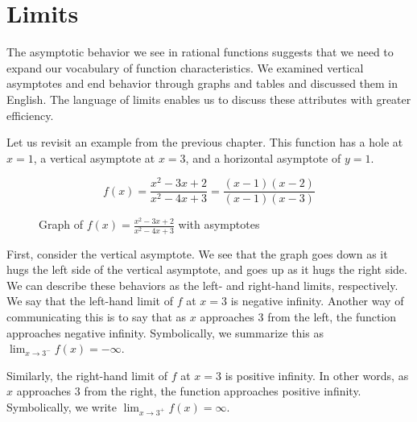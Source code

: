 \chapter{Limits}

The asymptotic behavior we see in rational functions suggests that we need to 
expand our vocabulary of function characteristics. We examined vertical 
asymptotes and end behavior through graphs and tables and discussed them in 
English. The language of limits enables us to discuss these attributes with 
greater efficiency. 

Let us revisit an example from the previous chapter. This function has a hole 
at $ x = 1 $, a vertical asymptote at $ x = 3 $, and a horizontal asymptote of 
$ y = 1 $.

$$ f(x) = \frac{x^2 - 3x + 2}{x^2 - 4x + 3} = \frac{(x-1)(x-2)}{(x-1)(x-3)} $$

\begin{figure}[htbp]
  \centering
  \caption{Graph of \( f(x) = \frac{x^2 - 3x + 2}{x^2 - 4x + 3} \) with 
  asymptotes}
\end{figure}

First, consider the vertical asymptote. We see that the graph goes down as it 
hugs the left side of the vertical asymptote, and goes up as it hugs the right 
side. We can describe these behaviors as the left- and right-hand limits, 
respectively. We say that the left-hand limit of $ f $ at $ x = 3 $ is 
negative infinity. Another way of communicating this is to say that as $ x $ 
approaches $ 3 $ from the left, the function approaches negative infinity. 
Symbolically, we summarize this as $ \lim_{x \rightarrow 3^-} f(x) = -\infty $.

Similarly, the right-hand limit of $ f $ at $ x = 3 $ is positive infinity. In 
other words, as $ x $ approaches $ 3 $ from the right, the function approaches 
positive infinity. Symbolically, we write $ \lim_{x \rightarrow 3^+} f(x) = 
\infty $.

